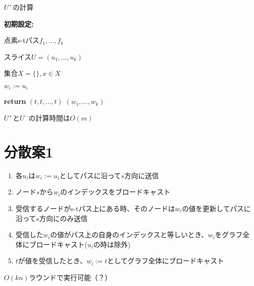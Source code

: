 \documentclass{jarticle}
\theoremstyle{definition}
\begin{document}
\begin{algorithm}[H]
        \caption{$U^+$の計算} 
        \textbf{初期設定:} \par
        点素s-tパス$f_1,...,f_k$ \par
        スライス$U=(u_1,...,u_k)$ \par
        集合$X=\{\},x\in X$ \par 
        $w_i := u_i$ \Comment {}\par
        {\setlength{\baselineskip}{10pt}
        \begin{algorithmic}[1]
           
          \EndFor
            \State \textbf{return} $(t,t,...,t)$
            \Else 
            \EndIf
          \EndWhile
           $(w_1,...,w_k)$
        \end{algorithmic}
        }
\end{algorithm}
$U^+$と$U^-$の計算時間は$O(m)$

\section*{分散案1}

\begin{enumerate}
  \item 各$u_i$は$w_i:=u_i$としてパスに沿って$s$方向に送信
  \item ノード$s$から$w_i$のインデックスをブロードキャスト
  \item 受信するノードがs-tパス上にある時、そのノードは$w_i$の値を更新してパスに沿って$s$方向にのみ送信
  \item 受信した$w_i$の値がパス上の自身のインデックスと等しいとき、$w_i$をグラフ全体にブロードキャスト($u_i$の時は除外)
  \item $t$が値を受信したとき、$w_i:=t$としてグラフ全体にブロードキャスト
\end{enumerate}
$O(kn)$ラウンドで実行可能（？）
\end{document}
